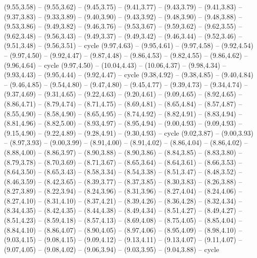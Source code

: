 \expandafter\def\csname geo:gebiet:VNM\endcsname{
  (9.55,3.58) -- (9.55,3.62) -- (9.45,3.75) -- (9.41,3.77) -- (9.43,3.79) -- (9.41,3.83) -- (9.37,3.83) -- (9.33,3.89) -- (9.40,3.90) -- (9.43,3.92) -- (9.48,3.90) -- (9.48,3.88) -- (9.53,3.86) -- (9.49,3.82) -- (9.46,3.76) -- (9.53,3.67) -- (9.59,3.62) -- (9.62,3.55) -- (9.62,3.48) -- (9.56,3.43) -- (9.49,3.37) -- (9.49,3.42) -- (9.46,3.44) -- (9.52,3.46) -- (9.51,3.48) -- (9.56,3.51) -- cycle}
\expandafter\def\csname geo:gebiet:PRK\endcsname{
  (9.97,4.63) -- (9.95,4.61) -- (9.97,4.58) -- (9.92,4.54) -- (9.97,4.50) -- (9.92,4.47) -- (9.87,4.48) -- (9.86,4.53) -- (9.82,4.55) -- (9.86,4.62) -- (9.96,4.64) -- cycle}
\expandafter\def\csname geo:gebiet:KOR\endcsname{
  (9.97,4.50) -- (10.04,4.43) -- (10.06,4.37) -- (9.98,4.34) -- (9.93,4.43) -- (9.95,4.44) -- (9.92,4.47) -- cycle}
\expandafter\def\csname geo:gebiet:MNG\endcsname{
  (9.38,4.92) -- (9.38,4.85) -- (9.40,4.84) -- (9.46,4.85) -- (9.54,4.80) -- (9.47,4.80) -- (9.45,4.77) -- (9.39,4.73) -- (9.34,4.74) -- (9.37,4.69) -- (9.31,4.65) -- (9.22,4.63) -- (9.20,4.61) -- (9.09,4.65) -- (8.92,4.65) -- (8.86,4.71) -- (8.79,4.74) -- (8.71,4.75) -- (8.69,4.81) -- (8.65,4.84) -- (8.57,4.87) -- (8.55,4.90) -- (8.58,4.90) -- (8.65,4.95) -- (8.74,4.92) -- (8.82,4.91) -- (8.83,4.94) -- (8.81,4.96) -- (8.82,5.00) -- (8.93,4.97) -- (8.95,4.94) -- (9.00,4.93) -- (9.09,4.93) -- (9.15,4.90) -- (9.22,4.89) -- (9.28,4.91) -- (9.30,4.93) -- cycle}
\expandafter\def\csname geo:gebiet:IND\endcsname{
  (9.02,3.87) -- (9.00,3.93) -- (8.97,3.93) -- (9.00,3.99) -- (8.91,4.00) -- (8.91,4.02) -- (8.86,4.04) -- (8.86,4.02) -- (8.88,4.00) -- (8.86,3.97) -- (8.90,3.88) -- (8.90,3.86) -- (8.84,3.85) -- (8.83,3.80) -- (8.79,3.78) -- (8.70,3.69) -- (8.71,3.67) -- (8.65,3.64) -- (8.64,3.61) -- (8.66,3.53) -- (8.64,3.50) -- (8.65,3.43) -- (8.58,3.34) -- (8.54,3.38) -- (8.51,3.47) -- (8.48,3.52) -- (8.46,3.59) -- (8.42,3.65) -- (8.39,3.77) -- (8.37,3.85) -- (8.30,3.83) -- (8.26,3.88) -- (8.27,3.89) -- (8.22,3.94) -- (8.24,3.96) -- (8.31,3.96) -- (8.27,4.04) -- (8.24,4.06) -- (8.27,4.10) -- (8.31,4.10) -- (8.37,4.21) -- (8.39,4.26) -- (8.36,4.28) -- (8.32,4.34) -- (8.34,4.35) -- (8.42,4.35) -- (8.44,4.38) -- (8.49,4.34) -- (8.51,4.27) -- (8.49,4.27) -- (8.51,4.23) -- (8.59,4.18) -- (8.57,4.13) -- (8.69,4.08) -- (8.75,4.05) -- (8.85,4.04) -- (8.84,4.10) -- (8.86,4.07) -- (8.90,4.05) -- (8.97,4.06) -- (8.95,4.09) -- (8.98,4.10) -- (9.03,4.15) -- (9.08,4.15) -- (9.09,4.12) -- (9.13,4.11) -- (9.13,4.07) -- (9.11,4.07) -- (9.07,4.05) -- (9.08,4.02) -- (9.06,3.94) -- (9.03,3.95) -- (9.04,3.88) -- cycle}
